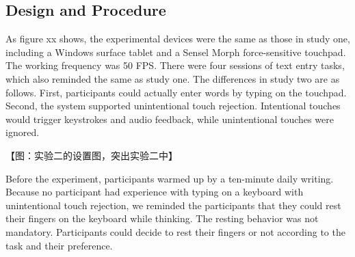 \subsection{Design and Procedure}

As figure xx shows, the experimental devices were the same as those in study one, including a Windows surface tablet and a Sensel Morph force-sensitive touchpad. The working frequency was 50 FPS. There were four sessions of text entry tasks, which also reminded the same as study one. The differences in study two are as follows. First, participants could actually enter words by typing on the touchpad. Second, the system supported unintentional touch rejection. Intentional touches would trigger keystrokes and audio feedback, while unintentional touches were ignored.

【图：实验二的设置图，突出实验二中】

Before the experiment, participants warmed up by a ten-minute daily writing. Because no participant had experience with typing on a keyboard with unintentional touch rejection, we reminded the participants that they could rest their fingers on the keyboard while thinking. The resting behavior was not mandatory. Participants could decide to rest their fingers or not according to the task and their preference.



